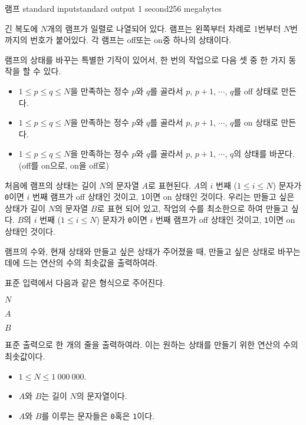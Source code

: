 \begin{problem}{램프}
	{standard input}{standard output}
	{1 second}{256 megabytes}{}
	
	긴 복도에 $N$개의 램프가 일렬로 나열되어 있다. 램프는 왼쪽부터 차례로 1번부터 $N$번까지의 번호가 붙어있다. 각 램프는 off또는 on중 하나의 상태이다.
	
	램프의 상태를 바꾸는 특별한 기작이 있어서, 한 번의 작업으로 다음 셋 중 한 가지 동작을 할 수 있다.
	
	\begin{itemize}
		\item $1 \le p \le q \le N$을 만족하는 정수 $p$와 $q$를 골라서 $p$, $p+1$, $\cdots$, $q$를 off 상태로 만든다.
		\item $1 \le p \le q \le N$을 만족하는 정수 $p$와 $q$를 골라서 $p$, $p+1$, $\cdots$, $q$를 on 상태로 만든다.
		\item $1 \le p \le q \le N$을 만족하는 정수 $p$와 $q$를 골라서 $p$, $p+1$, $\cdots$, $q$의 상태를 바꾼다. (off를 on으로, on을 off로)
	\end{itemize} 

	처음에 램프의 상태는 길이 $N$의 문자열 $A$로 표현된다. $A$의 $i$ 번째 ($1 \le i \le N$) 문자가 \texttt{0}이면 $i$ 번째 램프가 off 상태인 것이고, \texttt{1}이면 on 상태인 것이다. 우리는 만들고 싶은 상태가 길이 $N$의 문자열 $B$로 표현 되어 있고, 작업의 수를 최소한으로 하여 만들고 싶다. $B$의 $i$ 번째 ($1 \le i \le N$) 문자가 \texttt{0}이면 $i$ 번째 램프가 off 상태인 것이고, \texttt{1}이면 on 상태인 것이다. 
	
	램프의 수와, 현재 상태와 만들고 싶은 상태가 주어졌을 때, 만들고 싶은 상태로 바꾸는데에 드는 연산의 수의 최솟값을 출력하여라.

	\InputFile
	
	표준 입력에서 다음과 같은 형식으로 주어진다.
	
	$N$

	$A$

	$B$
	
	
	\OutputFile
	
	표준 출력으로 한 개의 줄을 출력하여라. 이는 원하는 상태를 만들기 위한 연산의 수의 최솟값이다.
		
	\Constraints
	
	\begin{itemize}
		\item $1 \le N \le 1\ 000\ 000$.
		\item $A$와 $B$는 길이 $N$의 문자열이다.
		\item $A$와 $B$를 이루는 문자들은 \texttt{0}혹은 \texttt{1}이다.
	\end{itemize}
	

\end{problem}
